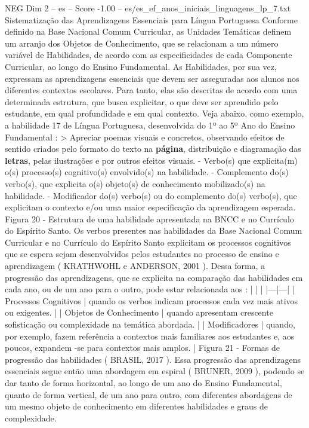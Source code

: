 \begin{textsample}{NEG Dim 2 – es – Score -1.00 – es/es\_ef\_anos\_iniciais\_linguagens\_lp\_7.txt}  \label{ex:f2_neg_077}
Sistematização das Aprendizagens Essenciais para Língua Portuguesa Conforme definido na Base Nacional Comum Curricular, as Unidades Temáticas definem um arranjo dos Objetos de Conhecimento, que se relacionam a um número variável de Habilidades, de acordo com as especificidades de cada Componente Curricular, ao longo do Ensino Fundamental.
As Habilidades, por sua vez, expressam as aprendizagens essenciais que devem ser asseguradas aos alunos nos diferentes contextos escolares.
Para tanto, elas são descritas de acordo com uma determinada estrutura, que busca explicitar, o que deve ser aprendido pelo estudante, em qual profundidade e em qual contexto.
Veja abaixo, como exemplo, a habilidade 17 de Língua Portuguesa, desenvolvida do 1º ao 5º Ano do Ensino Fundamental : > Apreciar poemas visuais e concretos, observando efeitos de sentido criados pelo formato do texto na \textbf{página}, distribuição e diagramação das \textbf{letras}, pelas ilustrações e por outros efeitos visuais. - Verbo(s) que explicita(m) o(s) processo(s) cognitivo(s) envolvido(s) na habilidade. - Complemento do(s) verbo(s), que explicita o(s) objeto(s) de conhecimento mobilizado(s) na habilidade. - Modificador do(s) verbo(s) ou do complemento do(s) verbo(s), que explicitam o contexto e/ou uma maior especificação da aprendizagem esperada.
Figura 20 - Estrutura de uma habilidade apresentada na BNCC e no Currículo do Espírito Santo.
Os verbos presentes nas habilidades da Base Nacional Comum Curricular e no Currículo do Espírito Santo explicitam os processos cognitivos que se espera sejam desenvolvidos pelos estudantes no processo de ensino e aprendizagem ( KRATHWOHL e ANDERSON, 2001 ).
Dessa forma, a progressão das aprendizagens, que se explicita na comparação das habilidades em cada ano, ou de um ano para o outro, pode estar relacionada aos : | | | |---|---| | Processos Cognitivos | quando os verbos indicam processos cada vez mais ativos ou exigentes. | | Objetos de Conhecimento | quando apresentam crescente sofisticação ou complexidade na temática abordada. | | Modificadores | quando, por exemplo, fazem referência a contextos mais familiares aos estudantes e, aos poucos, expandem -se para contextos mais amplos. | Figura 21 - Formas de progressão das habilidades ( BRASIL, 2017 ).
Essa progressão das aprendizagens essenciais segue então uma abordagem em espiral ( BRUNER, 2009 ), podendo se dar tanto de forma horizontal, ao longo de um ano do Ensino Fundamental, quanto de forma vertical, de um ano para outro, com diferentes abordagens de um mesmo objeto de conhecimento em diferentes habilidades e graus de complexidade.

\end{textsample}
